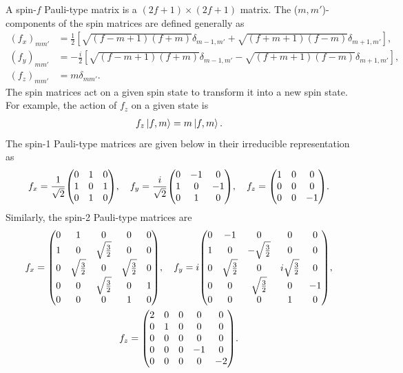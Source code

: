 A spin-\(f\) Pauli-type matrix is a \((2f + 1) \times (2f + 1)\) matrix.
The (\(m, m'\))-components of the spin matrices are defined generally
as~\cite{Kawaguchi2012}
\begin{align}
    {(f_x)}_{mm'} &= \frac{1}{2}\left[\sqrt{(f - m + 1)(f + m)}\delta_{m-1,m'}
        + \sqrt{(f + m + 1)(f - m)}\delta_{m+1,m'}\right], \\
    {(f_y)}_{mm'} &= -\frac{i}{2}\left[\sqrt{(f - m + 1)(f + m)}\delta_{m-1,m'}
        - \sqrt{(f + m + 1)(f - m)}\delta_{m+1,m'}\right], \\
    {(f_z)}_{mm'} &= m\delta_{mm'}.
\end{align}
The spin matrices act on a given spin state to transform it into a new spin
state.
For example, the action of \(f_z\) on a given state is
\begin{align}
    f_z\ket{f, m} = m\ket{f, m}.
\end{align}
The spin-1 Pauli-type matrices are given below in their irreducible
representation as~\cite{Kawaguchi2012}
\begin{align}\label{eq: spin-1-pauli-matrices}
    f_x = \frac{1}{\sqrt{2}}\mqty(0 & 1 & 0 \\ 1 & 0 & 1 \\ 0 & 1 & 0), \quad
    f_y = \frac{i}{\sqrt{2}}\mqty(0 & -1 & 0 \\ 1 & 0 & -1 \\ 0 & 1 & 0), \quad
    f_z = \mqty(1 & 0 & 0 \\ 0 & 0 & 0 \\ 0 & 0 & -1).
\end{align}
Similarly, the spin-2 Pauli-type matrices are
\begin{equation}\label{eq: spin-2-pauli-matrices}
    \begin{gathered}
        f_x = \mqty(
            0 & 1 & 0 & 0 & 0 \\
            1 & 0 & \sqrt{\frac{3}{2}} & 0 & 0 \\
            0 & \sqrt{\frac{3}{2}} & 0 & \sqrt{\frac{3}{2}} & 0 \\
            0 & 0 & \sqrt{\frac{3}{2}} & 0 & 1 \\
            0 & 0 & 0 & 1 & 0), \quad
        f_y = i\mqty(
            0 & -1 & 0 & 0 & 0 \\
            1 & 0 & -\sqrt{\frac{3}{2}} & 0 & 0 \\
            0 & \sqrt{\frac{3}{2}} & 0 & i\sqrt{\frac{3}{2}} & 0 \\
            0 & 0 & \sqrt{\frac{3}{2}} & 0 & -1 \\
            0 & 0 & 0 & 1 & 0), \\
        f_z = \mqty(
            2 & 0 & 0 & 0 & 0 \\
            0 & 1 & 0 & 0 & 0 \\
            0 & 0 & 0 & 0 & 0 \\
            0 & 0 & 0 & -1 & 0 \\
            0 & 0 & 0 & 0 & -2).
    \end{gathered}
\end{equation}

